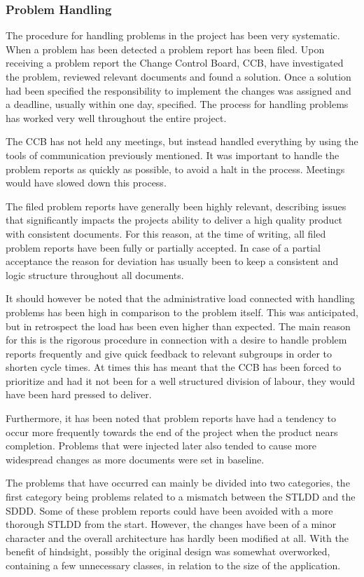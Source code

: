 \documentclass[a4paper]{article}
\begin{document}
\subsubsection{Problem Handling}

The procedure for handling problems in the project has been very systematic. When a problem has been detected a problem report has been filed. Upon receiving a problem report the Change Control Board, CCB, have investigated the problem, reviewed relevant documents and found a solution. Once a solution had been specified the responsibility to implement the changes was assigned and a deadline, usually within one day, specified. The process for handling problems has worked very well throughout the entire project. 

The CCB has not held any meetings, but instead handled everything by using the tools of communication previously mentioned. It was important to handle the problem reports as quickly as possible, to avoid a halt in the process. Meetings would have slowed down this process.

The filed problem reports have generally been highly relevant, describing issues that significantly impacts the projects ability to deliver a high quality product with consistent documents. For this reason, at the time of writing, all filed problem reports have been fully or partially accepted. In case of a partial acceptance the reason for deviation has usually been to keep a consistent and logic structure throughout all documents.

It should however be noted that the administrative load connected with handling problems has been high in comparison to the problem itself. This was anticipated, but in retrospect the load has been even higher than expected. The main reason for this is the rigorous procedure in connection with a desire to handle problem reports frequently and give quick feedback to relevant subgroups in order to shorten cycle times. At times this has meant that the CCB has been forced to prioritize and had it not been for a well structured division of labour, they would have been hard pressed to deliver.

Furthermore, it has been noted that problem reports have had a tendency to occur more frequently towards the end of the project when the product nears completion. Problems that were injected later also tended to cause more widespread changes as more documents were set in baseline.

The problems that have occurred can mainly be divided into two categories, the first category being problems related to a mismatch between the STLDD and the SDDD. Some of these problem reports could have been avoided with a more thorough STLDD from the start. However, the changes have been of a minor character and the overall architecture has hardly been modified at all. With the benefit of hindsight, possibly the original design was somewhat overworked, containing a few unnecessary classes, in relation to the size of the application.
\end{document}
